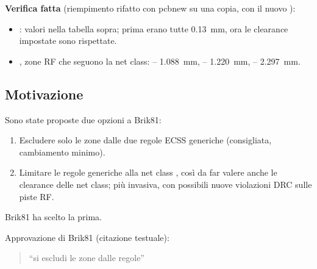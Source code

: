 \textbf{Verifica fatta} (riempimento rifatto con pcbnew su una copia, con il nuovo ):
\begin{itemize}
  \item {}: valori nella tabella sopra; prima erano tutte \SI{0,13}{\milli\metre}, ora le clearance impostate sono rispettate.
  \item {}, zone RF che seguono la net class: -- \SI{1,088}{\milli\metre}, -- \SI{1,220}{\milli\metre}, -- \SI{2,297}{\milli\metre}.
\end{itemize}

\subsection{Motivazione}
Sono state proposte due opzioni a Brik81:
\begin{enumerate}
  \item Escludere solo le zone dalle due regole ECSS generiche (consigliata, cambiamento minimo).
  \item Limitare le regole generiche alla net class , così da far valere anche le clearance delle net class; più invasiva, con possibili nuove violazioni DRC sulle piste RF.
\end{enumerate}
Brik81 ha scelto la prima.

Approvazione di Brik81 (citazione testuale):
\begin{quote}
``si escludi le zone dalle regole''
\end{quote}

